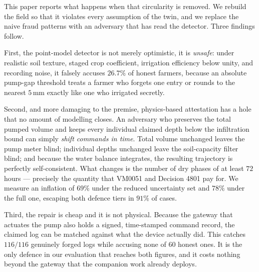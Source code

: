 \documentclass[journal]{IEEEtran}
\begin{document}
This paper reports what happens when that circularity is removed. We rebuild the
field so that it violates every assumption of the twin, and we replace the naive
fraud patterns with an adversary that has read the detector. Three findings
follow.

First, the point-model detector is not merely optimistic, it is \emph{unsafe}:
under realistic soil texture, staged crop coefficient, irrigation efficiency
below unity, and recording noise, it falsely accuses $26.7\%$ of honest farmers,
because an absolute pump-gap threshold treats a farmer who forgets one entry or
rounds to the nearest $5$\,mm exactly like one who irrigated secretly.

Second, and more damaging to the premise, physics-based attestation has a hole
that no amount of modelling closes. An adversary who preserves the total pumped
volume and keeps every individual claimed depth below the infiltration bound can
simply \emph{shift commands in time}. Total volume unchanged leaves the pump
meter blind; individual depths unchanged leave the soil-capacity filter blind;
and because the water balance integrates, the resulting trajectory is perfectly
self-consistent. What changes is the number of dry phases of at least $72$
hours --- precisely the quantity that VM0051 and Decision 4801 pay for. We
measure an inflation of $69\%$ under the reduced uncertainty set and $78\%$
under the full one, escaping both defence tiers in $91\%$ of cases.

Third, the repair is cheap and it is not physical. Because the gateway that
actuates the pump also holds a signed, time-stamped command record, the claimed
log can be matched against what the device actually did. This catches $116/116$
genuinely forged logs while accusing none of $60$ honest ones. It is the only
defence in our evaluation that reaches both figures, and it costs nothing beyond
the gateway that the companion work already deploys.
\end{document}
